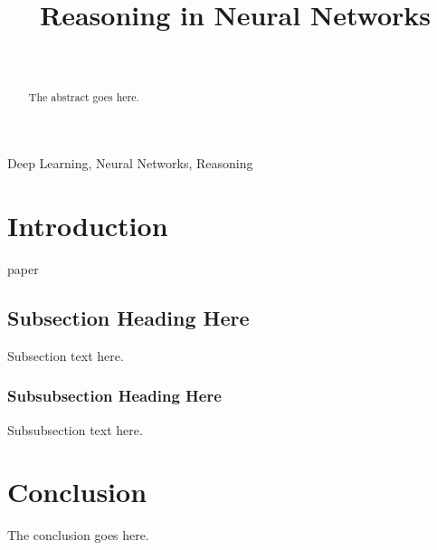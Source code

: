 \documentclass[journal]{IEEEtran}
\begin{document}
\title{Reasoning in Neural Networks}

\author{%
  \\
}

\maketitle


\begin{abstract}
The abstract goes here.
\end{abstract}


\begin{IEEEkeywords}
Deep Learning, Neural Networks, Reasoning
\end{IEEEkeywords}



\section{Introduction}

 paper \cite{bochkovskiy2020yolov4}


\subsection{Subsection Heading Here}
Subsection text here.


\subsubsection{Subsubsection Heading Here}
Subsubsection text here.


\section{Conclusion}
The conclusion goes here.



\end{document}
